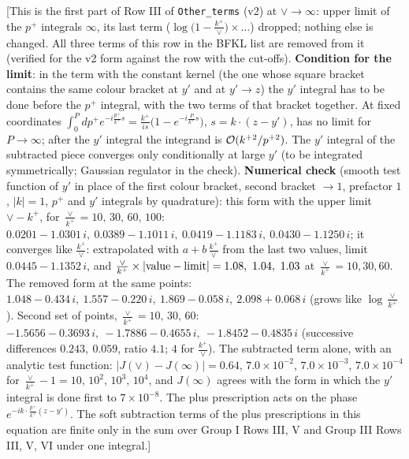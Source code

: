 \documentclass[10pt]{article}
\begin{document}
{[This is the first part of Row III of \texttt{Other\_terms} (v2) at $\vee\to\infty$: upper limit of the $p^{+}$ integrals $\infty$, its last term ($\log\big(1-\frac{k^{+}}{\vee}\big)\times\dots$) dropped; nothing else is changed. All three terms of this row in the BFKL list are removed from it (verified for the v2 form against the row with the cut-offs). \textbf{Condition for the limit}: in the term with the constant kernel (the one whose square bracket contains the same colour bracket at $y'$ and at $y'\to z$) the $y'$ integral has to be done before the $p^{+}$ integral, with the two terms of that bracket together. At fixed coordinates $\int_{0}^{P}dp^{+}e^{-i\frac{p^{+}}{k^{+}}s}=\frac{k^{+}}{is}\big(1-e^{-i\frac{P}{k^{+}}s}\big)$, $s=k\cdot(z-y')$, has no limit for $P\to\infty$; after the $y'$ integral the integrand is ${\cal O}(k^{+2}/p^{+2})$. The $y'$ integral of the subtracted piece converges only conditionally at large $y'$ (to be integrated symmetrically; Gaussian regulator in the check). \textbf{Numerical check} (smooth test function of $y'$ in place of the first colour bracket, second bracket $\to1$, prefactor $1$, $|k|=1$, $p^{+}$ and $y'$ integrals by quadrature): this form with the upper limit $\vee-k^{+}$, for $\frac{\vee}{k^{+}}=10,\,30,\,60,\,100$: $0.0201-1.0301\,i,\ 0.0389-1.1011\,i,\ 0.0419-1.1183\,i,\ 0.0430-1.1250\,i$; it converges like $\frac{k^{+}}{\vee}$: extrapolated with $a+b\,\frac{k^{+}}{\vee}$ from the last two values, limit $0.0445-1.1352\,i$, and $\frac{\vee}{k^{+}}\times|{\rm value}-{\rm limit}|=1.08,\ 1.04,\ 1.03$ at $\frac{\vee}{k^{+}}=10,30,60$. The removed form at the same points: $1.048-0.434\,i,\ 1.557-0.220\,i,\ 1.869-0.058\,i,\ 2.098+0.068\,i$ (grows like $\log\frac{\vee}{k^{+}}$). Second set of points, $\frac{\vee}{k^{+}}=10,\,30,\,60$: $-1.5656-0.3693\,i,\ -1.7886-0.4655\,i,\ -1.8452-0.4835\,i$ (successive differences $0.243,\ 0.059$, ratio $4.1$; $4$ for $\frac{k^{+}}{\vee}$). The subtracted term alone, with an analytic test function: $|J(\vee)-J(\infty)|=0.64$, $7.0\times10^{-2}$, $7.0\times10^{-3}$, $7.0\times10^{-4}$ for $\frac{\vee}{k^{+}}-1=10,\,10^{2},\,10^{3},\,10^{4}$, and $J(\infty)$ agrees with the form in which the $y'$ integral is done first to $7\times10^{-8}$. The plus prescription acts on the phase $e^{-ik\cdot\frac{p^{+}}{k^{+}}(z-y')}$. The soft subtraction terms of the plus prescriptions in this equation are finite only in the sum over Group I Rows III, V and Group III Rows III, V, VI under one integral.]\par\noindent}\par
\end{document}

